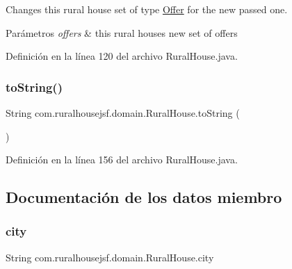 Changes this rural house set of type \mbox{\hyperlink{classcom_1_1ruralhousejsf_1_1domain_1_1_offer}{Offer}} for the new passed one. 


\begin{DoxyParams}{Parámetros}
{\em offers} & this rural houses new set of offers \\
\hline
\end{DoxyParams}


Definición en la línea 120 del archivo Rural\+House.\+java.

\mbox{\label{classcom_1_1ruralhousejsf_1_1domain_1_1_rural_house_a33c5888213bc3b3f5a4d3c0015f9d033}} 
\subsubsection{\texorpdfstring{toString()}{toString()}}
{\footnotesize\ttfamily String com.\+ruralhousejsf.\+domain.\+Rural\+House.\+to\+String (\begin{DoxyParamCaption}{ }\end{DoxyParamCaption})}



Definición en la línea 156 del archivo Rural\+House.\+java.



\subsection{Documentación de los datos miembro}
\mbox{\label{classcom_1_1ruralhousejsf_1_1domain_1_1_rural_house_a495797ff9bd294c83563790e36ec2245}} 
\subsubsection{\texorpdfstring{city}{city}}
{\footnotesize\ttfamily String com.\+ruralhousejsf.\+domain.\+Rural\+House.\+city\hspace{0.3cm}{\ttfamily [private]}}



